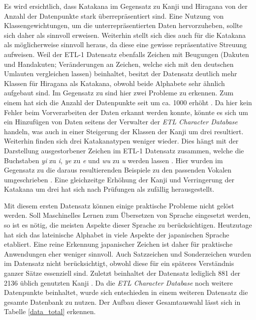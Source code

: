 \documentclass[twoside,a4paper]{IEEEtran}
\begin{document}
Es wird ersichtlich, dass Katakana im Gegensatz zu Kanji und Hiragana von der Anzahl der Datenpunkte stark überrepräsentiert sind. Eine Nutzung von Klassengewichtungen, um die unterrepräsentierten Daten hervorzuheben, sollte sich daher als sinnvoll erweisen. Weiterhin stellt sich dies auch für die Katakana als möglicherweise sinnvoll heraus, da diese eine gewisse repräsentative Streuung aufweisen. Weil der ETL-1 Datensatz ebenfalls Zeichen mit Beugungen (Da\-ku\-ten und Han\-da\-ku\-ten; Veränderungen an Zeichen, welche sich mit den deutschen Umlauten vergleichen lassen) beinhaltet, besitzt der Datensatz deutlich mehr Klassen für Hiragana als Katakana, obwohl beide Alphabete sehr ähnlich aufgebaut sind. Im Gegensatz zu \cite{RHC} sind hier zwei Probleme zu erkennen. Zum einem hat sich die Anzahl der Datenpunkte seit \cite{RHC} um ca. 1000 erhöht \cite[S.3]{RHC}. Da hier kein Fehler beim Vorverarbeiten der Daten erkannt werden konnte, könnte es sich um ein Hinzufügen von Daten seitens der Verwalter der \emph{ETL Character Database} handeln, was auch in einer Steigerung der Klassen der Kanji um drei resultiert. Weiterhin finden sich drei Katakanatypen weniger wieder. Dies hängt mit der Darstellung ausgestorbener Zeichen im ETL-1 Datensatz zusammen, welche die Buchstaben \textit{yi} zu \textit{i}, \textit{ye} zu \textit{e} und \textit{wu} zu \textit{u} werden lassen \cite{ETL}. Hier wurden im Gegensatz zu \cite{RHC} die daraus resultierenden Beispiele zu den passenden Vokalen umgeschrieben \cite[S.3]{RHC}. Eine gleichzeitge Erhöhung der Kanji und Verringerung der Katakana um drei hat sich nach Prüfungen als zufällig herausgestellt. 

Mit diesem ersten Datensatz können einige praktische Probleme nicht gelöst werden. Soll Maschinelles Lernen zum Übersetzen von Sprache eingesetzt werden, so ist es nötig, die meisten Aspekte dieser Sprache zu berücksichtigen. Heutzutage hat sich das lateinische Alphabet in viele Aspekte der japanischen Sprache etabliert. Eine reine Erkennung japanischer Zeichen ist daher für praktische Anwendungen eher weniger sinnvoll. Auch Satzzeichen und Sonderzeichen wurden im Datensatz nicht berücksichtigt, obwohl diese für ein späteres Verständnis ganzer Sätze essenziell sind. Zuletzt beinhaltet der Datensatz lediglich 881 der 2136 üblich genutzten Kanji \cite[S.3]{RHC}. Da die \emph{ETL Character Database} noch weitere Datenpunkte beinhaltet, wurde sich entschieden in einem weiteren Datensatz die gesamte Datenbank zu nutzen. Der Aufbau dieser Gesamtauswahl lässt sich in Tabelle \ref{data_total} erkennen.
\end{document}
